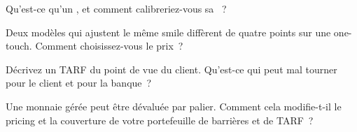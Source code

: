 \begin{interviewq}\label{iq:dv:fx-derivatives:3}
Qu'est-ce qu'un , et comment calibreriez-vous sa ~?
\end{interviewq}

\begin{interviewq}\label{iq:dv:fx-derivatives:4}
Deux modèles qui ajustent le même smile diffèrent de quatre points sur une one-touch. Comment choisissez-vous le prix~?
\end{interviewq}

\begin{interviewq}\label{iq:dv:fx-derivatives:5}
Décrivez un TARF du point de vue du client. Qu'est-ce qui peut mal tourner pour le client et pour la banque~?
\end{interviewq}

\begin{interviewq}\label{iq:dv:fx-derivatives:6}
Une monnaie gérée peut être dévaluée par palier. Comment cela modifie-t-il le pricing et la couverture de votre portefeuille de barrières et de TARF~?
\end{interviewq}
